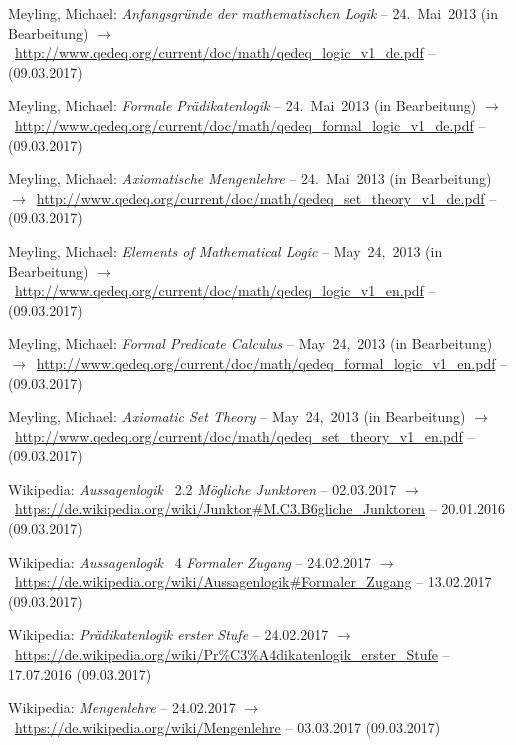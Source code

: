 \documentclass[english,ngerman,parskip=half,headsepline,footsepline]{scrreprt}
\begin{document}
\begin{flushleft}
\begin{thebibliography}{12}
			Meyling, Michael: \emph{Anfangsgründe der mathematischen Logik} -- 24.~Mai~2013 (in Bearbeitung) $\rightarrow$~\url{http://www.qedeq.org/current/doc/math/qedeq_logic_v1_de.pdf} -- (09.03.2017)

			Meyling, Michael: \emph{Formale Prädikatenlogik} -- 24.~Mai~2013 (in Bearbeitung) $\rightarrow$~\url{http://www.qedeq.org/current/doc/math/qedeq_formal_logic_v1_de.pdf} -- (09.03.2017)

			Meyling, Michael: \emph{Axiomatische Mengenlehre} -- 24.~Mai~2013 (in Bearbeitung) $\rightarrow$~\url{http://www.qedeq.org/current/doc/math/qedeq_set_theory_v1_de.pdf} -- (09.03.2017)

			Meyling, Michael: \emph{Elements of Mathematical Logic} -- May~24,~2013 (in Bearbeitung) $\rightarrow$~\url{http://www.qedeq.org/current/doc/math/qedeq_logic_v1_en.pdf} -- (09.03.2017)

			Meyling, Michael: \emph{Formal Predicate Calculus} -- May~24,~2013 (in Bearbeitung) $\rightarrow$~\url{http://www.qedeq.org/current/doc/math/qedeq_formal_logic_v1_en.pdf} -- (09.03.2017)

			Meyling, Michael: \emph{Axiomatic Set Theory} -- May~24,~2013 (in Bearbeitung) $\rightarrow$~\url{http://www.qedeq.org/current/doc/math/qedeq_set_theory_v1_en.pdf} -- (09.03.2017)

			Wikipedia: \emph{Aussagenlogik} \chaptername~2.2 \emph{Mögliche Junktoren} -- 02.03.2017 $\rightarrow$~\url{https://de.wikipedia.org/wiki/Junktor#M.C3.B6gliche_Junktoren} -- 20.01.2016 (09.03.2017)

			Wikipedia: \emph{Aussagenlogik} \chaptername~4 \emph{Formaler Zugang} -- 24.02.2017 $\rightarrow$~\url{https://de.wikipedia.org/wiki/Aussagenlogik#Formaler_Zugang} -- 13.02.2017 (09.03.2017)

			Wikipedia: \emph{Prädikatenlogik erster Stufe} -- 24.02.2017 $\rightarrow$~\url{https://de.wikipedia.org/wiki/Pr%C3%A4dikatenlogik_erster_Stufe} -- 17.07.2016 (09.03.2017)

			Wikipedia: \emph{Mengenlehre} -- 24.02.2017 $\rightarrow$~\url{https://de.wikipedia.org/wiki/Mengenlehre} -- 03.03.2017 (09.03.2017)

		\end{thebibliography}
	\end{flushleft}
\end{document}
